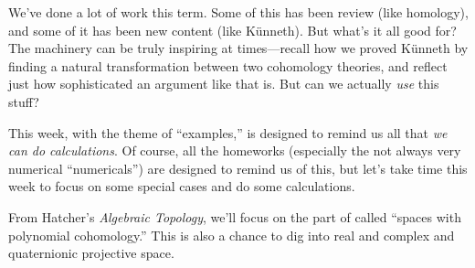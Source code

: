 \documentclass{homework}
\author{Jim Fowler}
\date{Week 8: Examples}
\begin{document}
\maketitle

We've done a lot of work this term.  Some of this has been review
(like homology), and some of it has been new content (like K\"unneth).
But what's it all good for?  The machinery can be truly inspiring at
times---recall how we proved K\"unneth by finding a natural
transformation between two cohomology theories, and reflect just how
sophisticated an argument like that is.  But can we actually
\textit{use} this stuff?

This week, with the theme of ``examples,'' is designed to remind us
all that \textit{we can do calculations}.  Of course, all the
homeworks (especially the not always very numerical ``numericals'')
are designed to remind us of this, but let's take time this week to
focus on some special cases and do some calculations.

From Hatcher's \textit{Algebraic Topology}, we'll focus on the part of
 called ``spaces with polynomial cohomology.''  This
is also a chance to dig into real and complex and quaternionic
projective space.
\end{document}
